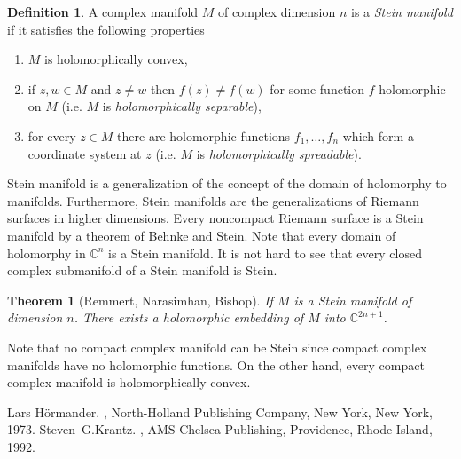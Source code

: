 \documentclass[12pt]{article}
\theoremstyle{theorem}
\newtheorem*{thm}{Theorem}
\theoremstyle{definition}
\newtheorem*{defn}{Definition}
\theoremstyle{remark}
\begin{document}
\begin{defn}
A complex manifold $M$ of complex dimension $n$ is a {\it Stein manifold} if it satisfies the following properties
\begin{enumerate}
\item $M$ is holomorphically convex,
\item if $z,w \in M$ and $z \not= w$ then $f(z) \not= f(w)$
for some function $f$ holomorphic on $M$ (i.e. $M$ is {\it holomorphically separable}),
\item for every $z \in M$ there are holomorphic functions $f_1,\ldots,f_n$
which form a coordinate system at $z$ (i.e. $M$ is {\it holomorphically spreadable}).
\end{enumerate}
\end{defn}

Stein manifold is a generalization of the concept of the domain of holomorphy to manifolds.  Furthermore, Stein manifolds are the generalizations of Riemann surfaces in higher dimensions.  Every noncompact Riemann surface is a Stein manifold
by a theorem of Behnke and Stein.
Note that every domain of holomorphy in ${\mathbb{C}}^n$ is a Stein manifold.
It is not hard to see that every closed complex submanifold of a Stein manifold is Stein.

\begin{thm}[Remmert, Narasimhan, Bishop]
If $M$ is a Stein manifold of dimension $n$.  There exists a  holomorphic embedding of $M$ into ${\mathbb{C}}^{2n+1}$.
\end{thm}

Note that no compact complex manifold can be Stein since compact complex manifolds have no holomorphic functions.  On the other hand, every compact complex manifold is holomorphically convex.

\begin{thebibliography}{9}
Lars H\"ormander.
{\em {}},
North-Holland Publishing Company, New York, New York, 1973.
Steven~G.\@ Krantz.
{\em {}},
AMS Chelsea Publishing, Providence, Rhode Island, 1992.
\end{thebibliography}
\end{document}

